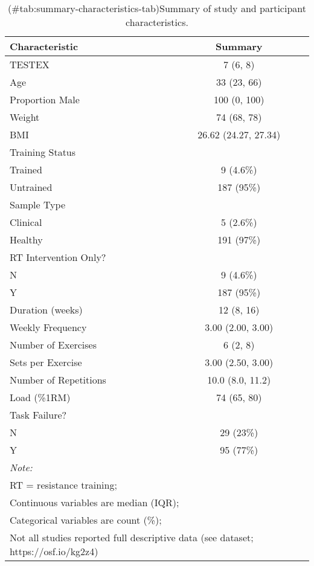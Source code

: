 \documentclass[
]{article}
\begin{document}
\begin{table}

\caption{(\#tab:summary-characteristics-tab)Summary of study and participant characteristics.}
\centering
\begin{tabular}[t]{l|c}
\hline
\textbf{Characteristic} & \textbf{Summary}\\
\hline
TESTEX & 7 (6, 8)\\
\hline
Age & 33 (23, 66)\\
\hline
Proportion Male & 100 (0, 100)\\
\hline
Weight & 74 (68, 78)\\
\hline
BMI & 26.62 (24.27, 27.34)\\
\hline
\multicolumn{2}{l}{Training Status}\\
\hline
\hspace{1em}Trained & 9 (4.6\%)\\
\hline
\hspace{1em}Untrained & 187 (95\%)\\
\hline
\multicolumn{2}{l}{Sample Type}\\
\hline
\hspace{1em}Clinical & 5 (2.6\%)\\
\hline
\hspace{1em}Healthy & 191 (97\%)\\
\hline
\multicolumn{2}{l}{RT Intervention Only?}\\
\hline
\hspace{1em}N & 9 (4.6\%)\\
\hline
\hspace{1em}Y & 187 (95\%)\\
\hline
Duration (weeks) & 12 (8, 16)\\
\hline
Weekly Frequency & 3.00 (2.00, 3.00)\\
\hline
Number of Exercises & 6 (2, 8)\\
\hline
Sets per Exercise & 3.00 (2.50, 3.00)\\
\hline
Number of Repetitions & 10.0 (8.0, 11.2)\\
\hline
Load (\%1RM) & 74 (65, 80)\\
\hline
\multicolumn{2}{l}{Task Failure?}\\
\hline
\hspace{1em}N & 29 (23\%)\\
\hline
\hspace{1em}Y & 95 (77\%)\\
\hline
\multicolumn{2}{l}{\rule{0pt}{1em}\textit{Note: }}\\
\multicolumn{2}{l}{\rule{0pt}{1em}RT = resistance training; }\\
\multicolumn{2}{l}{\rule{0pt}{1em}Continuous variables are median (IQR); }\\
\multicolumn{2}{l}{\rule{0pt}{1em}Categorical variables are count (\%); }\\
\multicolumn{2}{l}{\rule{0pt}{1em}Not all studies reported full descriptive data (see dataset; https://osf.io/kg2z4)}\\
\end{tabular}
\end{table}
\end{document}
